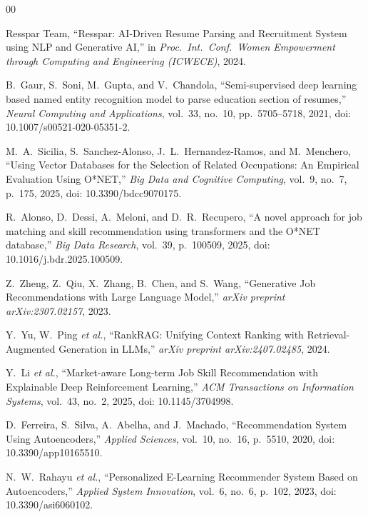 \documentclass[conference]{IEEEtran}
\begin{document}
\begin{thebibliography}{00}

Resspar Team, ``Resspar: AI-Driven Resume Parsing and Recruitment
System using NLP and Generative AI,'' in \emph{Proc.\ Int.\ Conf.\
Women Empowerment through Computing and Engineering (ICWECE)}, 2024.

B.\ Gaur, S.\ Soni, M.\ Gupta, and V.\ Chandola, ``Semi-supervised deep
learning based named entity recognition model to parse education section
of resumes,'' \emph{Neural Computing and Applications}, vol.\ 33,
no.\ 10, pp.\ 5705--5718, 2021, doi: 10.1007/s00521-020-05351-2.

M.\ A.\ Sicilia, S.\ Sanchez-Alonso, J.\ L.\ Hernandez-Ramos, and
M.\ Menchero, ``Using Vector Databases for the Selection of Related
Occupations: An Empirical Evaluation Using O*NET,'' \emph{Big Data
and Cognitive Computing}, vol.\ 9, no.\ 7, p.\ 175, 2025,
doi: 10.3390/bdcc9070175.

R.\ Alonso, D.\ Dessi, A.\ Meloni, and D.\ R.\ Recupero, ``A novel
approach for job matching and skill recommendation using transformers
and the O*NET database,'' \emph{Big Data Research}, vol.\ 39,
p.\ 100509, 2025, doi: 10.1016/j.bdr.2025.100509.

Z.\ Zheng, Z.\ Qiu, X.\ Zhang, B.\ Chen, and S.\ Wang, ``Generative
Job Recommendations with Large Language Model,'' \emph{arXiv preprint
arXiv:2307.02157}, 2023.

Y.\ Yu, W.\ Ping \emph{et al.}, ``RankRAG: Unifying Context Ranking
with Retrieval-Augmented Generation in LLMs,'' \emph{arXiv preprint
arXiv:2407.02485}, 2024.

Y.\ Li \emph{et al.}, ``Market-aware Long-term Job Skill Recommendation
with Explainable Deep Reinforcement Learning,'' \emph{ACM Transactions
on Information Systems}, vol.\ 43, no.\ 2, 2025,
doi: 10.1145/3704998.

D.\ Ferreira, S.\ Silva, A.\ Abelha, and J.\ Machado, ``Recommendation
System Using Autoencoders,'' \emph{Applied Sciences}, vol.\ 10, no.\ 16,
p.\ 5510, 2020, doi: 10.3390/app10165510.

N.\ W.\ Rahayu \emph{et al.}, ``Personalized E-Learning Recommender
System Based on Autoencoders,'' \emph{Applied System Innovation},
vol.\ 6, no.\ 6, p.\ 102, 2023, doi: 10.3390/asi6060102.


\end{thebibliography}
\end{document}
